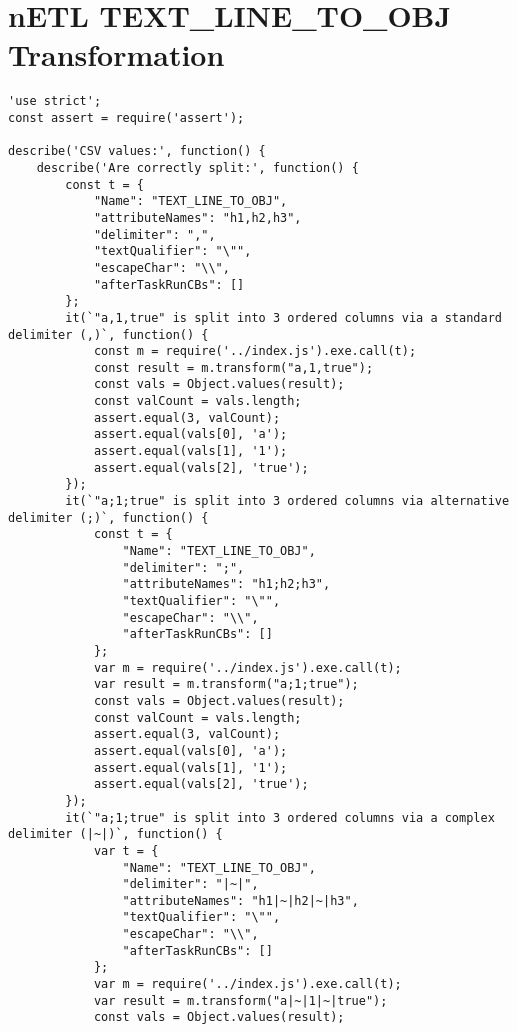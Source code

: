 \section{nETL TEXT\_LINE\_TO\_OBJ Transformation}
\label{TEXT_LINE_TO_OBJ-tests}
\begin{verbatim}
'use strict';
const assert = require('assert');

describe('CSV values:', function() {
    describe('Are correctly split:', function() {
        const t = {
            "Name": "TEXT_LINE_TO_OBJ",
            "attributeNames": "h1,h2,h3",
            "delimiter": ",",
            "textQualifier": "\"",
            "escapeChar": "\\",
            "afterTaskRunCBs": []
        };
        it(`"a,1,true" is split into 3 ordered columns via a standard delimiter (,)`, function() {
            const m = require('../index.js').exe.call(t);
            const result = m.transform("a,1,true");
            const vals = Object.values(result);
            const valCount = vals.length;
            assert.equal(3, valCount);
            assert.equal(vals[0], 'a');
            assert.equal(vals[1], '1');
            assert.equal(vals[2], 'true');
        });
        it(`"a;1;true" is split into 3 ordered columns via alternative delimiter (;)`, function() {
            const t = {
                "Name": "TEXT_LINE_TO_OBJ",
                "delimiter": ";",
                "attributeNames": "h1;h2;h3",
                "textQualifier": "\"",
                "escapeChar": "\\",
                "afterTaskRunCBs": []
            };
            var m = require('../index.js').exe.call(t);
            var result = m.transform("a;1;true");
            const vals = Object.values(result);
            const valCount = vals.length;
            assert.equal(3, valCount);
            assert.equal(vals[0], 'a');
            assert.equal(vals[1], '1');
            assert.equal(vals[2], 'true');
        });
        it(`"a;1;true" is split into 3 ordered columns via a complex delimiter (|~|)`, function() {
            var t = {
                "Name": "TEXT_LINE_TO_OBJ",
                "delimiter": "|~|",
                "attributeNames": "h1|~|h2|~|h3",
                "textQualifier": "\"",
                "escapeChar": "\\",
                "afterTaskRunCBs": []
            };
            var m = require('../index.js').exe.call(t);
            var result = m.transform("a|~|1|~|true");
            const vals = Object.values(result);

\end{verbatim}
